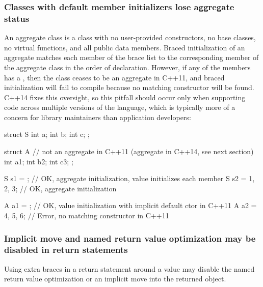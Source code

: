 \subsubsection[Classes with default member initializers lose aggregate status]{Classes with default member initializers lose aggregate status}\label{classes-with-default-member-initializers-lose-aggregate-status}

An aggregate class is a class with no user-provided constructors, no
base classes, no virtual functions, and all public data members. Braced
initialization of an aggregate matches each member of the brace list to
the corresponding member of the aggregate class in the order of
declaration. However, if any of the members has a , then the class ceases to be an aggregate in
C++11, and braced initialization will fail to compile because no
matching constructor will be found. C++14 fixes this oversight, so this
pitfall should occur only when supporting code across multiple versions
of the language, which is typically more of a concern for library
maintainers than application developers:

\begin{emcppslisting}
struct S
{
    int a;
    int b;
    int c;
};

struct A  // not an aggregate in C++11 (aggregate in C++14, see next section)
{
    int a{1};
    int b{2};
    int c{3};
};

S s1 = {};         // OK, aggregate initialization, value initializes each member
S s2 = {1, 2, 3};  // OK, aggregate initialization

A a1 = {};         // OK, value initialization with implicit default ctor in C++11
A a2 = {4, 5, 6};  // Error, no matching constructor in C++11
\end{emcppslisting}
    

\subsubsection[Implicit move and named return value optimization may be disabled in \lstinline!return! statements]{Implicit move and named return value optimization may be disabled in {\SubsubsecCode return} statements}\label{implicit-move-and-named-return-value-optimization-may-be-disabled-in-return-statements}

Using extra braces in a return statement around a value may disable the
named return value optimization or an implicit move into the returned
object.

